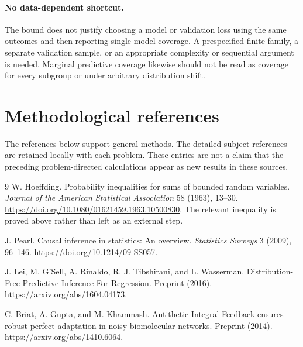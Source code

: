 \documentclass[11pt]{article}
\begin{document}
\paragraph{No data-dependent shortcut.}
The bound does not justify choosing a model or validation loss using the same
outcomes and then reporting single-model coverage. A prespecified finite family,
a separate validation sample, or an appropriate complexity or sequential argument
is needed. Marginal predictive coverage likewise should not be read as coverage
for every subgroup or under arbitrary distribution shift.


\section{Methodological references}
The references below support general methods. The detailed subject references
are retained locally with each problem. These entries are not a claim that the
preceding problem-directed calculations appear as new results in these sources.
\begin{thebibliography}{9}
W. Hoeffding. Probability inequalities for sums of bounded random variables.
\emph{Journal of the American Statistical Association} 58 (1963), 13--30.
\url{https://doi.org/10.1080/01621459.1963.10500830}.
The relevant inequality is proved above rather than left as an external step.

J. Pearl. Causal inference in statistics: An overview.
\emph{Statistics Surveys} 3 (2009), 96--146.
\url{https://doi.org/10.1214/09-SS057}.

J. Lei, M. G'Sell, A. Rinaldo, R. J. Tibshirani, and L. Wasserman.
Distribution-Free Predictive Inference For Regression. Preprint (2016).
\url{https://arxiv.org/abs/1604.04173}.

C. Briat, A. Gupta, and M. Khammash.
Antithetic Integral Feedback ensures robust perfect adaptation in noisy
biomolecular networks. Preprint (2014).
\url{https://arxiv.org/abs/1410.6064}.
\end{thebibliography}
\end{document}
